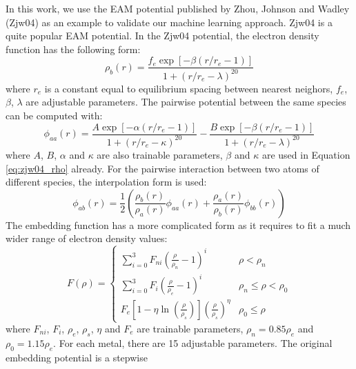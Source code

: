 \documentclass[final,3p,times]{elsarticle}
\begin{document}
In this work, we use the EAM potential published by Zhou, Johnson and Wadley 
(Zjw04) \cite{ZJW0,ZJW1,ZJW2} as an example to validate our machine learning 
approach. Zjw04 is a quite popular EAM potential. In the Zjw04 potential, the 
electron density function has the following form:
\begin{equation}
\label{eq:zjw04_rho}
\rho_{b}(r) = \frac{
    f_{e} \exp\left[ -\beta\left( r/r_{e} - 1 \right) \right]
}{
    1 + \left(r/r_{e} - \lambda\right)^{20}
}
\end{equation}
where $r_e$ is a constant equal to equilibrium spacing between nearest neighors, 
$f_{e}$, $\beta$, $\lambda$ are adjustable parameters. The pairwise potential 
between the same species can be computed with:
\begin{equation}
\label{eq:zjw04_phi_aa}
\phi_{aa}(r) = 
\frac{A \exp\left[ -\alpha\left( r/r_{e} - 1 \right) \right]}
     {1 + \left(r / r_{e} - \kappa\right)^{20}} - 
\frac{B \exp\left[ -\beta\left( r/r_{e} - 1 \right) \right]}
     {1 + \left(r / r_{e} - \lambda\right)^{20}}
\end{equation}
where $A$, $B$, $\alpha$ and $\kappa$ are also trainable parameters, $\beta$ and 
$\kappa$ are used in Equation \ref{eq:zjw04_rho} already. For the pairwise 
interaction between two atoms of different species, the interpolation form is 
used:
\begin{equation}
\label{eq:zjw04_phi_ab}
\phi_{ab}(r) = \frac{1}{2}\left(
    \frac{\rho_{b}(r)}{\rho_{a}(r)}\phi_{aa}(r) +
    \frac{\rho_{a}(r)}{\rho_{b}(r)}\phi_{bb}(r) 
\right)
\end{equation}
The embedding function has a more complicated form as it requires to fit a much 
wider range of electron density values:
\begin{equation}
\label{eq:zjw04_embed}
F(\rho) = \begin{cases}
    \sum_{i=0}^{3}{F_{ni}\left( \frac{\rho}{\rho_n} - 1 \right)^{i}} &
    \rho < \rho_{n} \\
    \sum_{i=0}^{3}{F_{i}\left( \frac{\rho}{\rho_e} - 1 \right)^{i}} &
    \rho_{n} \leq \rho < \rho_{0} \\
    F_{e}\left[ 
        1 - \eta\ln\left( \frac{\rho}{\rho_s}\right) 
    \right](\frac{\rho}{\rho_s})^{\eta} & \rho_{0} \leq \rho
\end{cases}
\end{equation}
where $F_{ni}$, $F_{i}$, $\rho_e$, $\rho_s$, $\eta$ and $F_{e}$ are trainable 
parameters, $\rho_n=0.85\rho_e$ and $\rho_0=1.15\rho_e$. For each metal, there 
are 15 adjustable parameters. The original embedding potential is a stepwise 
\end{document}
